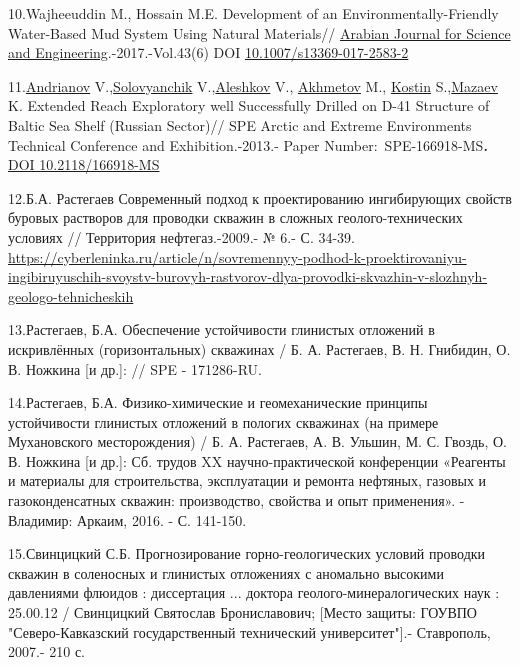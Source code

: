 \begin{noparindent}
10.Wajheeuddin M., Hossain M.E. Development of an
Environmentally-Friendly Water-Based Mud System Using Natural
Materials//
\href{https://www.researchgate.net/journal/Arabian-Journal-for-Science-and-Engineering-2191-4281?_tp=eyJjb250ZXh0Ijp7ImZpcnN0UGFnZSI6InB1YmxpY2F0aW9uIiwicGFnZSI6InB1YmxpY2F0aW9uIn19}{Arabian
Journal for Science and Engineering}.-2017.-Vol.43(6) DOI
\href{https://doi.org/10.1007/s13369-017-2583-2}{10.1007/s13369-017-2583-2}

11.\href{javascript:;}{Andrianov} V.,\href{javascript:;}{Solovyanchik}
V.,\href{javascript:;}{Aleshkov} V., \href{javascript:;}{Akhmetov} M.,
\href{javascript:;}{Kostin} S.,\href{javascript:;}{Mazaev} K. Extended
Reach Exploratory well Successfully Drilled on D-41 Structure of Baltic
Sea Shelf (Russian Sector)// SPE Arctic and Extreme Environments
Technical Conference and Exhibition.-2013.- Paper
Number:~SPE-166918-MS{\bfseries .}
\href{https://doi.org/10.2118/166918-MS}{DOI 10.2118/166918-MS}

12.Б.А. Растегаев Современный подход к проектированию ингибирующих
свойств буровых растворов для проводки скважин в сложных
геолого-технических условиях // Территория нефтегаз.-2009.- № 6.- С.
34-39.
\url{https://cyberleninka.ru/article/n/sovremennyy-podhod-k-proektirovaniyu-ingibiruyuschih-svoystv-burovyh-rastvorov-dlya-provodki-skvazhin-v-slozhnyh-geologo-tehnicheskih}

13.Растегаев, Б.А. Обеспечение устойчивости глинистых отложений в
искривлённых (горизонтальных) скважинах / Б. А. Растегаев, В. Н.
Гнибидин, О. В. Ножкина {[}и др.{]}: // SPE - 171286-RU.

14.Растегаев, Б.А. Физико-химические и геомеханические принципы
устойчивости глинистых отложений в пологих скважинах (на примере
Мухановского месторождения) / Б. А. Растегаев, А. В. Ульшин, М. С.
Гвоздь, О. В. Ножкина {[}и др.{]}: Сб. трудов XX научно-практической
конференции «Реагенты и материалы для строительства, эксплуатации и
ремонта нефтяных, газовых и газоконденсатных скважин: производство,
свойства и опыт применения». - Владимир: Аркаим, 2016. - С. 141-150.

15.Свинцицкий С.Б. Прогнозирование горно-геологических условий проводки
скважин в соленосных и глинистых отложениях с аномально высокими
давлениями флюидов : диссертация ... доктора геолого-минералогических
наук : 25.00.12 / Свинцицкий Святослав Брониславович; {[}Место защиты:
ГОУВПО "Северо-Кавказский государственный технический университет"{]}.-
Ставрополь, 2007.- 210 с.


\end{noparindent}
